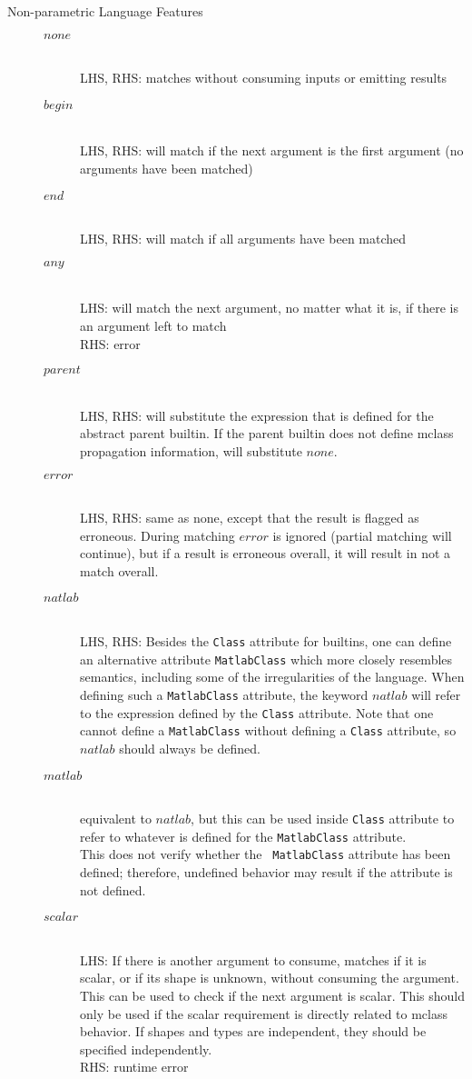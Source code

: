 \begin{description}
\item[Non-parametric Language Features] \hfill %
\begin{description}
\item[$none$] \hfill \\
  LHS, RHS: matches without consuming inputs or emitting results
\item[$begin$] \hfill \\
  LHS, RHS: will match if the next argument is the first argument (no
  arguments have been matched)
\item[$end$] \hfill \\
  LHS, RHS: will match if all arguments have been matched
\item[$any$] \hfill \\
  LHS: will match the next argument, no matter what it is, if there
  is an argument left to match \\
  RHS: error
\item[$parent$] \hfill \\
  LHS, RHS: will substitute the expression that is defined for the abstract
  parent builtin. If the parent builtin does not define mclass
  propagation information, will substitute $none$.
\item[$error$] \hfill \\
  LHS, RHS: same as none, except that the result is flagged as
  erroneous. During matching $error$ is ignored (partial matching will
  continue), but if a result is erroneous overall, it will result in
  not a match overall.
\item[$natlab$] \hfill \\
  LHS, RHS: Besides the {\tt Class} attribute for builtins, one can define an
  alternative attribute {\tt MatlabClass} which more closely resembles \matlab
  semantics, including some of the irregularities of the language. When
  defining such a {\tt MatlabClass} attribute, the keyword $natlab$ will refer to
  the expression defined by the {\tt Class} attribute. Note that one cannot
  define a {\tt MatlabClass} without defining a {\tt Class} attribute, so $natlab$
  should always be defined.
\item[$matlab$] \hfill \\ equivalent to $natlab$, but this can be used
  inside {\tt Class} attribute to refer to whatever is defined for the
  {\tt MatlabClass} attribute.\\ This does not verify whether the {\tt
    MatlabClass} attribute has been defined; therefore, undefined
  behavior may result if the attribute is not defined.
\item[$scalar$] \hfill
  \\ LHS: If there is another argument to consume, matches if it is
  scalar, or if its shape is unknown, without consuming the argument.
  This can be used to check if the next argument is scalar. This
  should only be used if the scalar requirement is directly related to
  mclass behavior. If shapes and types are independent, they should be
  specified independently.
  \\ RHS: runtime error
\end{description}
\end{description}

